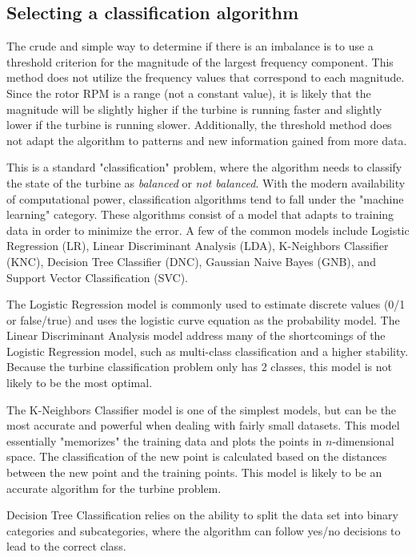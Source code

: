 \subsection{Selecting a classification algorithm}
The crude and simple way to determine if there is an imbalance is to use a threshold criterion for the magnitude of the largest frequency component.  This method does not utilize the frequency values that correspond to each magnitude.  Since the rotor RPM is a range (not a constant value), it is likely that the magnitude will be slightly higher if the turbine is running faster and slightly lower if the turbine is running slower.  Additionally, the threshold method does not adapt the algorithm to patterns and new information gained from more data.

This is a standard "classification" problem, where the algorithm needs to classify the state of the turbine as \textit{balanced} or \textit{not balanced}.  With the modern availability of computational power, classification algorithms tend to fall under the "machine learning" category.  These algorithms consist of a model that adapts to training data in order to minimize the error.  A few of the common models include Logistic Regression (LR), Linear Discriminant Analysis (LDA), K-Neighbors Classifier (KNC), Decision Tree Classifier (DNC), Gaussian Naive Bayes (GNB), and Support Vector Classification (SVC).

The Logistic Regression model is commonly used to estimate discrete values (0/1 or false/true) and uses the logistic curve equation as the probability model.  The Linear Discriminant Analysis model address many of the shortcomings of the Logistic Regression model, such as multi-class classification and a higher stability.  Because the turbine classification problem only has 2 classes, this model is not likely to be the most optimal.

The K-Neighbors Classifier model is one of the simplest models, but can be the most accurate and powerful when dealing with fairly small datasets.  This model essentially "memorizes" the training data and plots the points in $n$-dimensional space.  The classification of the new point is calculated based on the distances between the new point and the training points.  This model is likely to be an accurate algorithm for the turbine problem.

Decision Tree Classification relies on the ability to split the data set into binary categories and subcategories, where the algorithm can follow yes/no decisions to lead to the correct class.

